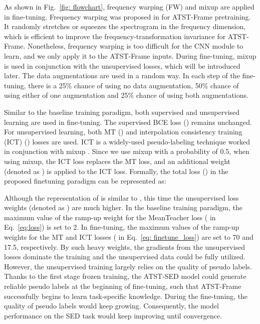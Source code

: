 \documentclass{article}
\begin{document}
As shown in Fig.~\ref{fig: flowchart}, frequency warping (FW) and mixup are applied in fine-tuning. Frequency warping was proposed in \cite{li2023self} for ATST-Frame pretraining. It randomly stretches or squeezes the spectrogram in the frequency dimension, which is efficient to improve the frequency-transformation invariance for ATST-Frame. Nonetheless, frequency warping is too difficult for the CNN module to learn, and we only apply it to the ATST-Frame inputs. 
During fine-tuning, mixup is used in conjunction with the unsupervised losses, which will be introduced later. The data augmentations are used in a random way. In each step of the fine-tuning, there is a 25\% chance of using no data augmentation, 50\% chance of using either of one augmentation and 25\% chance of using both augmentations.

Similar to the baseline training paradigm, both supervised and unsupervised learning are used in fine-tuning. The supervised BCE loss () remains unchanged. For unsupervised learning, both MT () and interpolation consistency training (ICT) () losses are used. ICT is a widely-used pseudo-labeling technique \cite{zheng21skcrnn, nam22fdy} worked in conjunction with mixup \cite{zhang2017mixup}. 
Since we use mixup with a probability of 0.5, when using mixup, the ICT loss \cite{verma2019interpolation} replaces the MT loss, and an additional weight (denoted as ) is applied to the ICT loss. Formally, the total loss () in the proposed finetuning paradigm can be represented as: 

Although the representation of  is similar to , this time the unsupervised loss weights (denoted as ) are much higher. In the baseline training paradigm, the maximum value of the ramp-up weight for the MeanTeacher loss ( in Eq.~\ref{eq:loss}) is set to 2. In fine-tuning, the maximum values of the ramp-up weights for the MT and ICT losses ( in Eq.~\ref{eq: finetune_loss}) are set to 70 and 17.5, respectively. By such heavy weights, the gradients from the unsupervised losses dominate the training and the unsupervised data could be fully utilized. However, the unsupervised training largely relies on the quality of  pseudo labels. Thanks to the first stage frozen training, the ATST-SED model could generate reliable pseudo labels at the beginning of fine-tuning, such that ATST-Frame successfully begins to learn task-specific knowledge. During the fine-tuning, the quality of pseudo labels would keep growing. Consequently, the model performance on the SED task would keep improving until convergence. 
 
\end{document}
